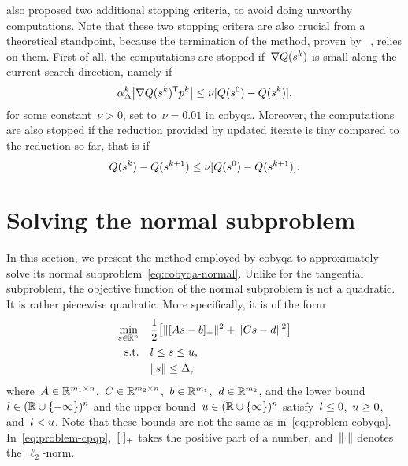  also proposed two additional stopping criteria, to avoid doing unworthy computations.
Note that these two stopping critera are also crucial from a theoretical standpoint, because the termination of the method, proven by \citeauthor{Powell_2015}~\cite[\S~5]{Powell_2015}, relies on them.
First of all, the computations are stopped if~$\nabla Q(\sstep[k])$ is small along the current search direction, namely if
\begin{equation*}
    \alpha_{\rad}^k \abs[\big]{\nabla Q(\sstep[k])^{\T} \pstep[k]} \le \nu [Q(\sstep[0]) - Q(\sstep[k])],
\end{equation*}
for some constant~$\nu > 0$, set to~$\nu = 0.01$ in \gls{cobyqa}.
Moreover, the computations are also stopped if the reduction provided by updated iterate is tiny compared to the reduction so far, that is if
\begin{equation*}
    Q(\sstep[k]) - Q(\sstep[k + 1]) \le \nu [Q(\sstep[0]) - Q(\sstep[k + 1])].
\end{equation*}


\section{Solving the normal subproblem}
\label{sec:cobyqa-normal}

In this section, we present the method employed by \gls{cobyqa} to approximately solve its normal subproblem~\cref{eq:cobyqa-normal}.
Unlike for the tangential subproblem, the objective function of the normal subproblem is not a quadratic.
It is rather piecewise quadratic.
More specifically, it is of the form
\begin{subequations}
    \label{eq:problem-cpqp}
    \begin{align}
        \min_{\sstep \in \R^n}  & \quad \frac{1}{2} \big[ \norm{\posp{A \sstep - b}}^2 + \norm{C \sstep - d}^2 \big]\\
        \text{s.t.}             & \quad \xl \le \sstep \le \xu,\\
                                & \quad \norm{\sstep} \le \rad,
    \end{align}
\end{subequations}
where~$A \in \mathbb{R}^{m_1 \times n}$,~$C \in \mathbb{R}^{m_2 \times n}$,~$b \in \mathbb{R}^{m_1}$,~$d \in \mathbb{R}^{m_2}$, and the lower bound~$l \in (\mathbb{R} \cup \{-\infty\})^n$ and the upper bound~$u \in (\mathbb{R} \cup \{\infty\})^n$ satisfy~$l \le 0$,~$u \ge 0$, and~$l < u$.
Note that these bounds are not the same as in~\cref{eq:problem-cobyqa}.
In~\cref{eq:problem-cpqp},~$[\cdot]_+$ takes the positive part of a number, and~$\lVert\cdot\rVert$ denotes the~$\ell_2$-norm.

